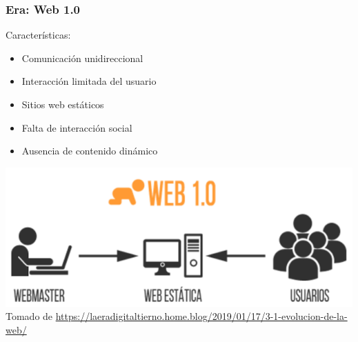 \documentclass[
10pt, %
aspectratio=169, %
]{beamer}
\begin{document}
	\begin{frame}
		
		\frametitle{Era: Web 1.0}
		
		Características:
		\begin{itemize}

			\item Comunicación unidireccional
			
			\item Interacción limitada del usuario
		
			\item Sitios web estáticos
			
			\item Falta de interacción social
		
			\item Ausencia de contenido dinámico  
			
		\end{itemize}
		
		\centering
		\includegraphics[scale=0.53]{web1_0.png} \\[2mm]
		
		{\scriptsize Tomado de \url{https://laeradigitaltierno.home.blog/2019/01/17/3-1-evolucion-de-la-web/}}
		
		
	\end{frame}
	
\end{document}
